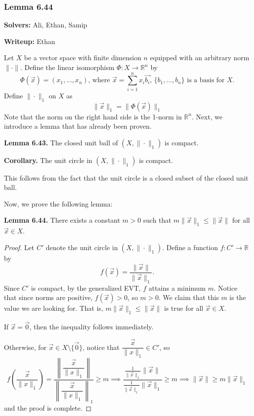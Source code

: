 \documentclass{article}
\theoremstyle{plain} %
\numberwithin{thm}{section} %
\theoremstyle{definition}
\begin{document}
    \subsubsection{Lemma 6.44}

    \textbf{Solvers:} Ali, Ethan, Samip

    \noindent\textbf{Writeup:} Ethan

    Let \(X\) be a vector space with finite dimension \(n\) equipped with an arbitrary norm \(\|\cdot\|\). Define the linear isomorphism \(\Phi: X \to \mathbb{R}^n\) by
    \[
        \Phi (\vec{x}) = (x_1, ..., x_n) \text{, where } \vec{x} = \sum_{i=1}^n x_i \vec{b_i} \text{, } \{b_1, ..., b_n\} \text{ is a basis for } X \text{.}
    \]
    Define \(\|\cdot\| _1\) on \(X\) as
    \[
        \|\vec{x}\| _1 = \|\Phi (\vec{x})\| _1
    \]
    Note that the norm on the right hand side is the 1-norm in \(\mathbb{R}^n\). Next, we introduce a lemma that has already been proven.

    \noindent\textbf{Lemma 6.43.} The closed unit ball of \((X,\|\cdot\| _1)\) is compact.

    \noindent\textbf{Corollary.} The unit circle in \((X, \|\cdot\| _1)\) is compact.

    This follows from the fact that the unit circle is a closed subset of the closed unit ball.
    
    \noindent Now, we prove the following lemma:

    \noindent\textbf{Lemma 6.44.} There exists a constant \(m > 0\) such that \(m\|\vec{x}\| _1 \leq \|\vec{x}\|\) for all \(\vec{x} \in X\).

    \begin{proof}
        Let \(C'\) denote the unit circle in \((X,\|\cdot\| _1)\). Define a function \(f: C' \to \mathbb{R}\) by
        \[
            f(\vec{x}) = \frac{\|\vec{x}\|}{\|\vec{x}\| _1} \text{.}
        \]
        Since \(C'\) is compact, by the generalized EVT, \(f\) attains a minimum \(m\). Notice that since norms are positive, \(f(\vec{x}) > 0\), so \(m > 0\). We claim that this \(m\) is the value we are looking for. That is, \(m\|\vec{x}\| _1 \leq \|\vec{x}\|\) is true for all \(\vec{x} \in X\).

        If \(\vec{x} = \vec{0}\), then the inequality follows immediately.

        Otherwise, for \(\vec{x} \in X \setminus \{\vec{0}\}\), notice that \(\dfrac{\vec{x}}{\|x\| _1} \in C'\), so
        \[
            f \left( \dfrac{\vec{x}}{\|x\| _1} \right) = \frac{\left\lVert \dfrac{\vec{x}}{\|x\| _1} \right\rVert }{\left\lVert \dfrac{\vec{x}}{\|x\| _1} \right\rVert _1} \geq m \implies \dfrac{\frac{1}{\|\vec{x}\| _1} \|\vec{x}\|}{\frac{1}{\|\vec{x}\| _1}\|\vec{x}\| _1} \geq m \implies \|\vec{x}\| \geq m\|\vec{x}\| _1
        \]
        and the proof is complete.

    \end{proof}
\end{document}
